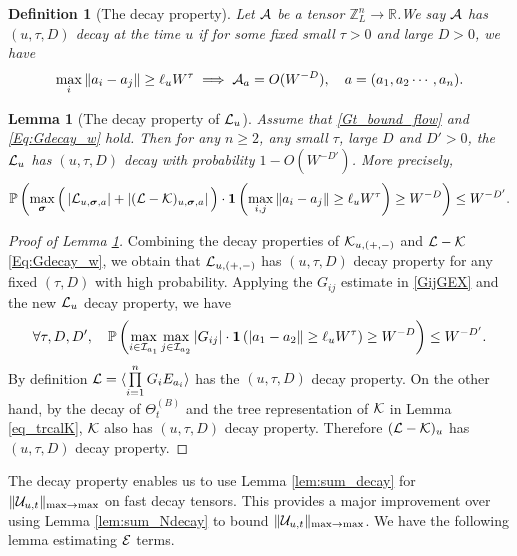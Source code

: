 \documentclass[10pt,reqno]{article}
\theoremstyle{plain} %
\newtheorem{lemma}[theorem]{Lemma}
\newtheorem{definition}[theorem]{Definition}
\theoremstyle{remark}
\numberwithin{equation}{section}
\begin{document}
\begin{definition}[The decay property]\label{Def_decay}
   Let  $\cal A$ be a tensor $\mathbb Z_L^n\to \mathbb R$.We say $\cal A$ has $(u, \tau, D)$ decay at the  time $u$ if  for some fixed small $\tau>0$ and large $D>0$, we have  
\begin{equation}\label{deccA}
    \max_i\|a_i-a_j\|\ge \ell_u W^{\tau} \implies  {\cal A}_{\textbf{a}}=O(W^{-D}),\quad \textbf{a}=(a_1,a_2\cdots, a_n) .
\end{equation}
\end{definition}
\begin{lemma}[The decay property of ${\cal L}_u$]\label{lem_decayLoop}  
Assume that \eqref{Gt_bound_flow} and \eqref{Eq:Gdecay_w} hold. Then  for 
any $n\ge 2$, any small $\tau$, large $D$ and $D'>0$,  the  ${\cal L}_u$ has $(u, \tau, D)$ decay  with probability $1-O(W^{-D'})$. More precisely, 
\begin{align}\label{res_decayLK}
\mathbb P\left( \max_{\boldsymbol{\sigma}}  \Big(\left|{\cal L}_{u,\boldsymbol{\sigma},\textbf{a}}\right|+\left|{(\cal L-K})_{u,\boldsymbol{\sigma},\textbf{a}}\right|\Big)\cdot{\bf 1}\left(\max_{  i, j } \|a_i-a_j\|\ge \ell_u W^{\tau}\right) \ge W^{-D}\right)\le W^{-D'} .
\end{align}
 \end{lemma}
 \begin{proof}[Proof of Lemma \ref{lem_decayLoop}] Combining  the decay properties  of ${\cal K}_{u,(+,-)}$ and $\cal L-\cal K$  \eqref{Eq:Gdecay_w}, we obtain that  
 ${\cal L}_{u,(+,-)}$ has $(u, \tau, D)$ decay property  for any fixed $(\tau, D)$  with high probability.
 Applying the $G_{ij}$ estimate in \eqref{GijGEX} and  the new ${\cal L}_u$ decay property, we have 
 $$
   \forall \tau, D, D', \quad \mathbb P\left( \max_{i\in {\cal I}_{a_1}}\max_{j\in {\cal I}_{a_2}}|G_{ij}|
 \cdot{\bf 1}\left( |a_1-a_2\|\ge \ell_u W^{\tau}\right) \ge W^{-D}\right)\le W^{-D'} .
 $$
By definition  ${\cal L}=\langle \prod\limits_{i=1}^n G_i E_{a_i}\rangle $  has the $(u, \tau, D)$ decay property.  On the other hand, by the decay of $\Theta^{(B)}_t$ and  the tree representation of $\cal K$ in Lemma \ref{eq_trcalK},  $\cal K$ also   has $(u, \tau, D)$ decay property. Therefore $({\cal L-\cal K})_u$ has $(u, \tau, D)$ decay property. 
 
 \end{proof}

The decay property enables us to use  Lemma \ref{lem:sum_decay} for $\|{\cal U}_{u,t}\|_{\max\to \max}$ on fast decay tensors. This provides a major  improvement over using Lemma \ref{lem:sum_Ndecay} to bound $\|{\cal U}_{u,t}\|_{\max\to \max}$.  We have the following lemma estimating   $\cal E$ terms.
\end{document}
